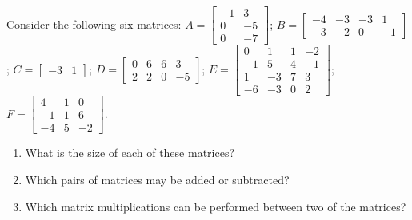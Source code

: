 \sectionExercises


\begin{exercise} \label{ex:} 
Consider the following six matrices:
\(A=\begin{bmatrix} -1&3
\\0&-5
\\0&-7 \end{bmatrix}\);
\(B=\begin{bmatrix} -4&-3&-3&1
\\-3&-2&0&-1 \end{bmatrix}\);
\(C=\begin{bmatrix} -3&1 \end{bmatrix}\);
\(D=\begin{bmatrix} 0&6&6&3
\\2&2&0&-5 \end{bmatrix}\);
\(E=\begin{bmatrix} 0&1&1&-2
\\-1&5&4&-1
\\1&-3&7&3
\\-6&-3&0&2 \end{bmatrix}\);
\(F=\begin{bmatrix} 4&1&0
\\-1&1&6
\\-4&5&-2 \end{bmatrix}\).
\begin{enumerate}
\item What is the size of each of these matrices?

\item  Which pairs of matrices may be added or subtracted?

\item  Which matrix multiplications can be performed between two of the matrices?

\end{enumerate}
\end{exercise}





